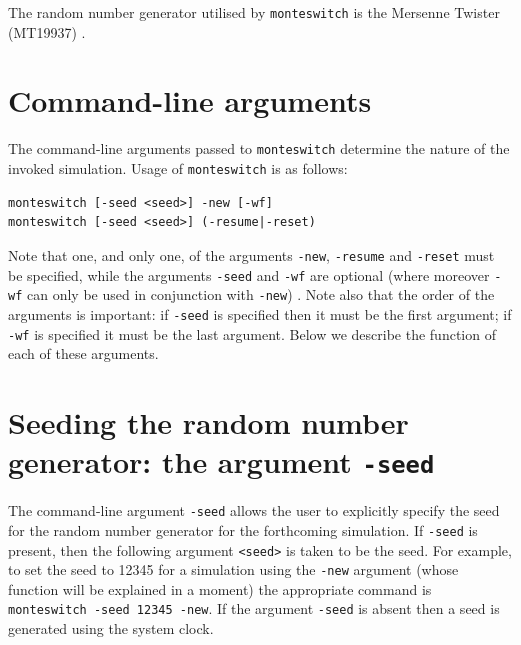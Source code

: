\documentclass{report}
\begin{document}
The random number generator utilised by \texttt{monteswitch} is the Mersenne Twister (MT19937) \cite{Matsumoto_1998}.


\section{Command-line arguments}
The command-line arguments passed to \texttt{monteswitch} determine the nature of the invoked simulation. Usage of \texttt{monteswitch} is as follows: 
\begin{verbatim}
monteswitch [-seed <seed>] -new [-wf]
monteswitch [-seed <seed>] (-resume|-reset)
\end{verbatim}
Note that one, and only one, of the arguments \texttt{-new}, \texttt{-resume} and \texttt{-reset} must be specified,
while the arguments \texttt{-seed} and \texttt{-wf} are optional (where moreover \texttt{-wf} can only be used in conjunction with \texttt{-new}) . 
Note also that the order of the arguments is important: if \texttt{-seed} is specified then it must be the first argument; if
\texttt{-wf} is specified it must be the last argument. Below we describe the function of each of these arguments.


\section{Seeding the random number generator: the argument \texttt{-seed}}
The command-line argument \texttt{-seed} allows the user to explicitly specify the seed for the random number generator for the forthcoming simulation. 
If \texttt{-seed} is present, then the following argument \texttt{<seed>}
is taken to be the seed. For example, to set the seed to 12345 for a simulation using the \texttt{-new}
argument (whose function will be explained in a moment) the appropriate command is \texttt{monteswitch -seed 12345 -new}.
If the argument \texttt{-seed} is absent then a seed is generated using the system clock.
\end{document}
